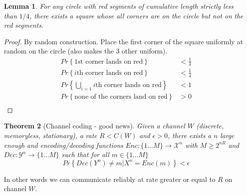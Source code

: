 \documentclass[twoside]{article}
\newtheorem{theorem}{Theorem}[section]
\newtheorem{lemma}[theorem]{Lemma}
\theoremstyle{definition} %
\renewcommand{\Pr}[1]{Pr\left\{#1\right\}}
\def\X{\mathcal{X}}
\def\Y{\mathcal{Y}}
\begin{document}
\begin{lemma}
  For any circle with red segments of cumulative length strictly less than $1/4$, there exists a square whose all corners are on the circle but not on the red segments.
\end{lemma}

\begin{proof}
  By random construction. Place the first corner of the square uniformly at random on the circle (also makes the 3 other uniform).
  \begin{align*}
    \Pr{\text{1st corner lands on red}} &< \frac 1 4\\
    \Pr{i\text{th corner lands on red}} &< \frac 1 4\\
    \Pr{\bigcup\limits_{i=1} i\text{th corner lands on red}} &< 1\\
    \Pr{\text{none of the corners land on red}} &> 0\\
  \end{align*}
\end{proof}

\begin{theorem}[Channel coding - good news]
  \label{thm:channel-coding}
  Given a channel $W$ (discrete, memoryless, stationary), a rate $R < C(W)$ and $\epsilon > 0$, there exists a $n$ large enough and encoding/decoding functions $Enc:\{1\dots M\} \to \X^n$ with $M \geq 2^{nR}$ and $Dec: \Y^n \to \{1\dots M\}$ such that for all $m\in\{1\dots M\}$
  \[
    \Pr{Dec(Y^n) \not = m | X^n = Enc(m) } < \epsilon
  \]
\end{theorem}

In other words we can communicate reliably at rate greater or equal to $R$ on channel $W$.
\end{document}
